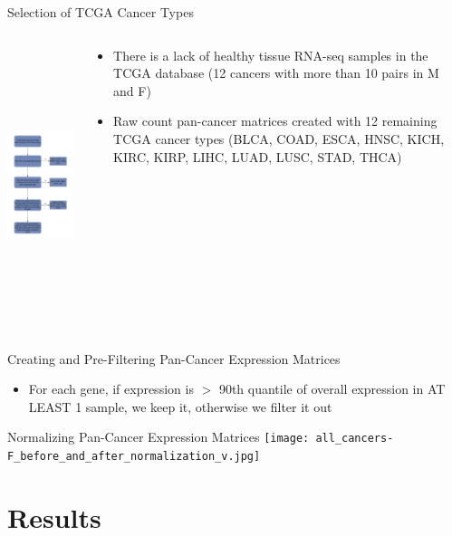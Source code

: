 \documentclass{beamer}
\begin{document}
	\begin{frame}{Selection of TCGA Cancer Types}
			\begin{columns}
				\begin{column}{0.45\textwidth}
					\includegraphics[width=5cm, height=8cm]{img3.png}
				\end{column}
				\begin{column}{0.5\textwidth}
					\begin{itemize}
						\item There is a lack of healthy tissue RNA-seq samples in the TCGA database (12 cancers with more than 10 pairs in M and F)
						\item Raw count pan-cancer matrices created with 12 remaining TCGA cancer types (BLCA, COAD, ESCA, HNSC, KICH, KIRC, KIRP, LIHC, LUAD, LUSC, STAD, THCA)
					\end{itemize}
				\end{column}
			\end{columns}			
	\end{frame}

	\begin{frame}{Creating and Pre-Filtering Pan-Cancer Expression Matrices}
		\begin{itemize}
			\item For each gene, if expression is $>$ 90th quantile of overall expression in AT LEAST 1 sample, we keep it, otherwise we filter it out
		\end{itemize}
	\end{frame}

	\begin{frame}{Normalizing Pan-Cancer Expression Matrices}
		\texttt{[image: all\_cancers-F\_before\_and\_after\_normalization\_v.jpg]}
	\end{frame}

	\section{Results}

	
\end{document}
